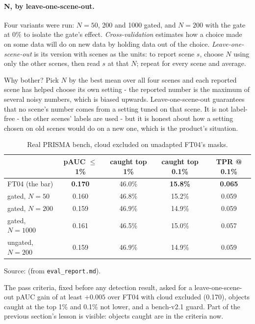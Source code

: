 \paragraph{N, by leave-one-scene-out.} 
Four variants were run: $N = 50$, 200 and 1000 gated, and $N = 200$ with the gate at 0\% to isolate the gate's effect.
\emph{Cross-validation} estimates how a choice made on some data will do on new data by holding data out of the choice.
\emph{Leave-one-scene-out} is its version with scenes as the units: to report scene $s$, choose $N$ using only the other
scenes, then read $s$ at that $N$; repeat for every scene and average.

Why bother? Pick $N$ by the best mean over all four scenes and each reported scene has helped choose its own setting - the
reported number is the maximum of several noisy numbers, which is biased upwards. Leave-one-scene-out guarantees that no
scene's number comes from a setting tuned on that scene. It is not label-free - the other scenes' labels are used - but it is
honest about how a setting chosen on old scenes would do on a new one, which is the product's situation.

\begin{table}[htbp]
\centering
\caption{Real PRISMA bench, cloud excluded on unadapted FT04's masks.}
\label{tab:scoringgains:adapt}
\small
\begin{tabular}{lcccc}
\toprule
 & pAUC $\le$ 1\% & caught top 1\% & caught top 0.1\% & TPR @ 0.1\% \\
\midrule
FT04 (the bar) & \textbf{0.170} & 46.0\% & \textbf{15.8\%} & \textbf{0.065} \\
gated, $N = 50$ & 0.160 & 46.8\% & 15.2\% & 0.059 \\
gated, $N = 200$ & 0.159 & 46.9\% & 14.9\% & 0.059 \\
gated, $N = 1000$ & 0.161 & 46.5\% & 15.0\% & 0.057 \\
ungated, $N = 200$ & 0.159 & 46.9\% & 14.9\% & 0.059 \\
\bottomrule
\end{tabular}

\smallskip
{\footnotesize Source:  (from \texttt{eval\_report.md}).}
\end{table}

The pass criteria, fixed before any detection result, asked for a leave-one-scene-out pAUC gain of at least $+0.005$ over
FT04 with cloud excluded (0.170), objects caught at the top 1\% and 0.1\% not lower, and a bench-v2.1 guard. Part of the
previous section's lesson is visible: objects caught are in the criteria now.

